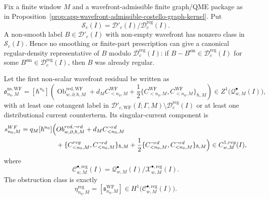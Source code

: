 \begin{thm}
\label{thm:wt-wavefront-singular-current-eta-obstruction}
  Fix a finite window \(M\) and a wavefront-admissible finite graph/QME
  package as in
  Proposition~\ref{prop:app-wavefront-admissible-costello-graph-kernel}.
  Put
  \[
    \mathcal S_c(I)
      =
    \mathcal D'_c(I)/\mathcal D^{\mathrm{reg}}_c(I).
  \]
  A non-smooth label \(B\in\mathcal D'_c(I)\) with
  non-empty wavefront has nonzero class in \(\mathcal S_c(I)\).  Hence no
  smoothing or finite-part prescription can give a canonical
  regular-density representative of \(B\) modulo
  \(\mathcal D^{\mathrm{reg}}_c(I)\): if
  \(B-B^{\mathrm{sm}}\in\mathcal D^{\mathrm{reg}}_c(I)\) for some
  \(B^{\mathrm{sm}}\in\mathcal D^{\mathrm{reg}}_c(I)\), then \(B\) was
  already regular.

  Let the first non-scalar wavefront residual be written as
  \[
    \mathfrak o^{\mathrm{ns,WF}}_{n_0,M}
      =
      [\hbar^{n_0}]\left(
        \operatorname{Ob}^{\mathrm{red,WF}}_{w,\partial,\hbar,M}
        +d_MC^{\mathrm{WF}}_{<n_0,M}
        +\frac12
          \{C^{\mathrm{WF}}_{<n_0,M},
            C^{\mathrm{WF}}_{<n_0,M}\}_{\hbar,M}
      \right)
      \in Z^1\bigl(\mathcal Q^\bullet_{w,M}(I)\bigr),
  \]
  with at least one cotangent label in
  \(\mathcal D'_{c,\mathrm{WF}}(I;\Gamma,M)\setminus
  \mathcal D^{\mathrm{reg}}_c(I)\) or at least one distributional
  current counterterm.  Its singular-current component is
  \begin{equation}\label{eq:wt-wavefront-singular-component}
  \begin{aligned}
    \mathfrak s^{\mathrm{WF}}_{n_0,M}
      =
      q_M[\hbar^{n_0}]\Bigl(
        &\operatorname{Ob}^{\mathrm{red},\neg\mathrm{rd}}_{w,\partial,\hbar,M}
        +d_MC^{\neg\mathrm{rd}}_{<n_0,M} \\
        &+\{C^{\mathrm{reg}}_{<n_0,M},
             C^{\neg\mathrm{rd}}_{<n_0,M}\}_{\hbar,M}
        +\frac12
          \{C^{\neg\mathrm{rd}}_{<n_0,M},
             C^{\neg\mathrm{rd}}_{<n_0,M}\}_{\hbar,M}
      \Bigr)
      \in
      \mathcal C^{1,\mathrm{reg}}_{w,M}(I),
  \end{aligned}
  \end{equation}
  where
  \[
    \mathcal C^{\bullet,\mathrm{reg}}_{w,M}(I)
      =
    \mathcal Q^\bullet_{w,M}(I)/
    \mathcal X^{\bullet,\mathrm{reg}}_{w,M}(I).
  \]
  The obstruction class is exactly
  \[
    \eta^{\mathrm{reg}}_{n_0,M}
      =
    [\mathfrak s^{\mathrm{WF}}_{n_0,M}]
      \in
    H^1\bigl(\mathcal C^{\bullet,\mathrm{reg}}_{w,M}(I)\bigr).
  \]


\end{thm}
